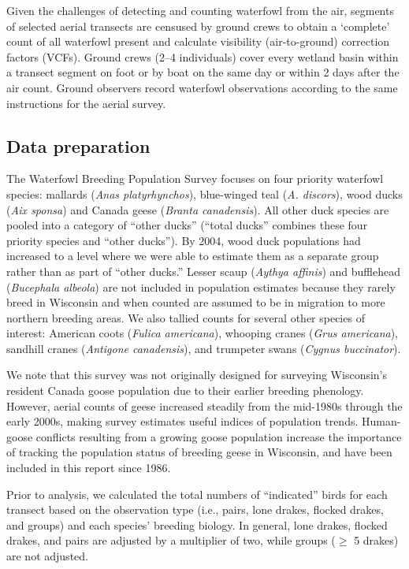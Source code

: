 \documentclass[
  12pt,
]{article}
\begin{document}
Given the challenges of detecting and counting waterfowl from the air,
segments of selected aerial transects are censused by ground crews to
obtain a `complete' count of all waterfowl present and calculate
visibility (air-to-ground) correction factors (VCFs). Ground crews (2--4
individuals) cover every wetland basin within a transect segment on foot
or by boat on the same day or within 2 days after the air count. Ground
observers record waterfowl observations according to the same
instructions for the aerial survey.

\hypertarget{data-preparation}{%
\subsection{Data preparation}\label{data-preparation}}

The Waterfowl Breeding Population Survey focuses on four priority
waterfowl species: mallards (\emph{Anas platyrhynchos}), blue-winged
teal (\emph{A. discors}), wood ducks (\emph{Aix sponsa}) and Canada
geese (\emph{Branta canadensis}). All other duck species are pooled into
a category of ``other ducks'' (``total ducks'' combines these four
priority species and ``other ducks''). By 2004, wood duck populations
had increased to a level where we were able to estimate them as a
separate group rather than as part of ``other ducks.'' Lesser scaup
(\emph{Aythya affinis}) and bufflehead (\emph{Bucephala albeola}) are
not included in population estimates because they rarely breed in
Wisconsin and when counted are assumed to be in migration to more
northern breeding areas. We also tallied counts for several other
species of interest: American coots (\emph{Fulica americana}), whooping
cranes (\emph{Grus americana}), sandhill cranes (\emph{Antigone
canadensis}), and trumpeter swans (\emph{Cygnus buccinator}).

We note that this survey was not originally designed for surveying
Wisconsin's resident Canada goose population due to their earlier
breeding phenology. However, aerial counts of geese increased steadily
from the mid-1980s through the early 2000s, making survey estimates
useful indices of population trends. Human-goose conflicts resulting
from a growing goose population increase the importance of tracking the
population status of breeding geese in Wisconsin, and have been included
in this report since 1986.

Prior to analysis, we calculated the total numbers of ``indicated''
birds for each transect based on the observation type (i.e., pairs, lone
drakes, flocked drakes, and groups) and each species' breeding biology.
In general, lone drakes, flocked drakes, and pairs are adjusted by a
multiplier of two, while groups (\(\geq\) 5 drakes) are not adjusted.
\end{document}
